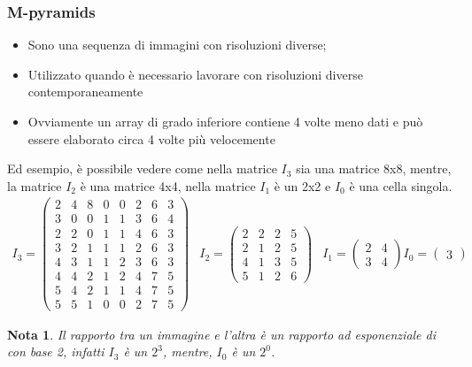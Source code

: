 \documentclass{report}
\newtheorem{nota}{Nota}
\begin{document}
\subsubsection{M-pyramids}
\label{sec:mpyram}
\begin{itemize}
\item Sono una sequenza di immagini con risoluzioni diverse;
\item Utilizzato quando è necessario lavorare con risoluzioni diverse
  contemporaneamente
\item Ovviamente un array di grado inferiore contiene 4 volte meno dati
  e può essere elaborato circa 4 volte più velocemente
\end{itemize}
Ed esempio, è possibile vedere come nella matrice $I_3$ sia una matrice
8x8, mentre, la matrice $I_2$ è una matrice 4x4, nella matrice $I_1$ è
un 2x2 e $I_0$ è una cella singola. 
\begin{eqnarray}
  \label{eq:mpyram}
  I_3=
  \begin{pmatrix}
    2 & 4 & 8 & 0 & 0 & 2 & 6 & 3\\
    3 & 0 & 0 & 1 & 1 & 3 & 6 & 4\\
    2 & 2 & 0 & 1 & 1 & 4 & 6 & 3\\
    3 & 2 & 1 & 1 & 1 & 2 & 6 & 3\\
    4 & 3 & 1 & 1 & 2 & 3 & 6 & 3\\
    4 & 4 & 2 & 1 & 2 & 4 & 7 & 5\\
    5 & 4 & 2 & 1 & 1 & 4 & 7 & 5\\
    5 & 5 & 1 & 0 & 0 & 2 & 7 & 5
  \end{pmatrix} &
  I_2=\begin{pmatrix}
    2 & 2 & 2 & 5\\
    2 & 1 & 2 & 5\\
    4 & 1 & 3 & 5\\
    5 & 1 & 2 & 6
  \end{pmatrix} & I_1=
  \begin{pmatrix}
    2 & 4\\
    3 & 4
  \end{pmatrix} I_0=
  \begin{pmatrix}
    3
  \end{pmatrix}
\end{eqnarray}
\begin{nota}
  Il rapporto tra un immagine e l'altra è un rapporto ad esponenziale di
  con base 2, infatti $I_3$ è un $2^3$, mentre, $I_0$ è un $2^0$. 
\end{nota}
\end{document}

